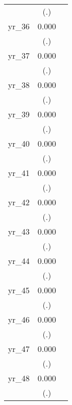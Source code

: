 \begin{table}[htbp]
\begin{tabular}{l*{2}{c}}
            &         (.)         &                     \\
yr\_36       &       0.000         &                     \\
            &         (.)         &                     \\
yr\_37       &       0.000         &                     \\
            &         (.)         &                     \\
yr\_38       &       0.000         &                     \\
            &         (.)         &                     \\
yr\_39       &       0.000         &                     \\
            &         (.)         &                     \\
yr\_40       &       0.000         &                     \\
            &         (.)         &                     \\
yr\_41       &       0.000         &                     \\
            &         (.)         &                     \\
yr\_42       &       0.000         &                     \\
            &         (.)         &                     \\
yr\_43       &       0.000         &                     \\
            &         (.)         &                     \\
yr\_44       &       0.000         &                     \\
            &         (.)         &                     \\
yr\_45       &       0.000         &                     \\
            &         (.)         &                     \\
yr\_46       &       0.000         &                     \\
            &         (.)         &                     \\
yr\_47       &       0.000         &                     \\
            &         (.)         &                     \\
yr\_48       &       0.000         &                     \\
            &         (.)         &                     \\

\end{tabular}
\end{table}
